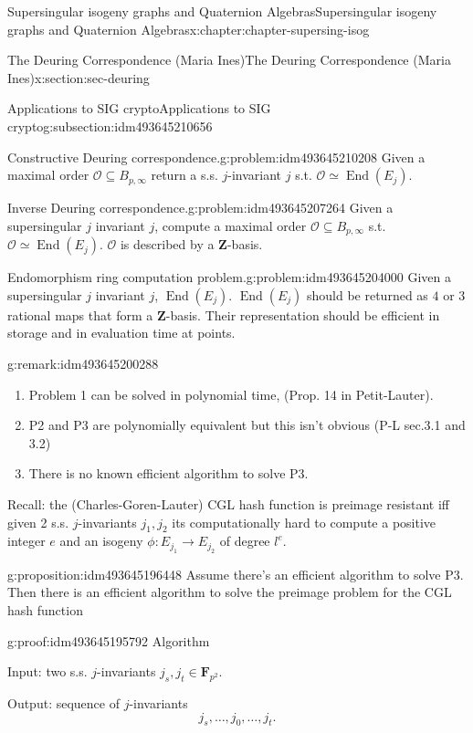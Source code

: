\documentclass[oneside,10pt,]{book}
\numberwithin{equation}{section}
\newcommand{\ZZ}{\mathbf{Z}}
\newcommand{\FF}{\mathbf{F}}
\newcommand{\ints}{\mathcal{O}}
\DeclareMathOperator{\End}{End}
\begin{document}
\begin{chapterptx}{Supersingular isogeny graphs and Quaternion Algebras}{}{Supersingular isogeny graphs and Quaternion Algebras}{}{}{x:chapter:chapter-supersing-isog}
\begin{sectionptx}{The Deuring Correspondence (Maria Ines)}{}{The Deuring Correspondence (Maria Ines)}{}{}{x:section:sec-deuring}
\begin{subsectionptx}{Applications to SIG crypto}{}{Applications to SIG crypto}{}{}{g:subsection:idm493645210656}
\begin{problem}{Constructive Deuring correspondence.}{g:problem:idm493645210208}
Given a maximal order \(\ints \subseteq B_{p,\infty}\) return a s.s. \(j\)-invariant \(j\) s.t. \(\ints \simeq \End(E_j)\).%
\end{problem}
\begin{problem}{Inverse Deuring correspondence.}{g:problem:idm493645207264}%
Given a supersingular \(j\) invariant \(j\), compute a maximal order \(\ints \subseteq B_{p,\infty}\)  s.t. \(\ints \simeq \End(E_j)\). \(\ints\) is described by a \(\ZZ\)-basis.%
\end{problem}
\begin{problem}{Endomorphism ring computation problem.}{g:problem:idm493645204000}%
Given a supersingular \(j\) invariant \(j\), \(\End(E_j)\). \(\End(E_j)\) should be returned as \(4\) or \(3\) rational maps that form a \(\ZZ\)-basis. Their representation should be efficient in storage and in evaluation time at points.%
\end{problem}
\begin{remark}{}{g:remark:idm493645200288}%
%
\begin{enumerate}
\item{}Problem 1 can be solved in polynomial time, (Prop. 14 in Petit-Lauter).%
\item{}P2 and P3 are polynomially equivalent but this isn't obvious (P-L sec.3.1 and 3.2)%
\item{}There is no known efficient algorithm to solve P3.%
\end{enumerate}
%
\end{remark}
Recall: the (Charles-Goren-Lauter) CGL hash function is preimage resistant iff given 2 s.s. \(j\)-invariants \(j_1,j_2\) its computationally hard to compute a  positive integer \(e\) and an isogeny \(\phi \colon E_{j_1} \to E_{j_2}\) of degree \(l^e\).%
\begin{proposition}{}{}{g:proposition:idm493645196448}%
Assume there's an efficient algorithm to solve P3. Then there is an efficient algorithm to solve the preimage problem for the CGL hash function%
\end{proposition}
\begin{proofptx}{}{g:proof:idm493645195792}
Algorithm%
\par
Input: two s.s. \(j\)-invariants \(j_s,j_t \in \FF_{p^2}\).%
\par
Output: sequence of \(j\)-invariants%
\begin{equation*}
j_s,\ldots,j_0,\ldots, j_t\text{.}
\end{equation*}
%
\par
%
\begin{enumerate}

\end{enumerate}
\end{proofptx}
\end{subsectionptx}
\end{sectionptx}
\end{chapterptx}
\end{document}
